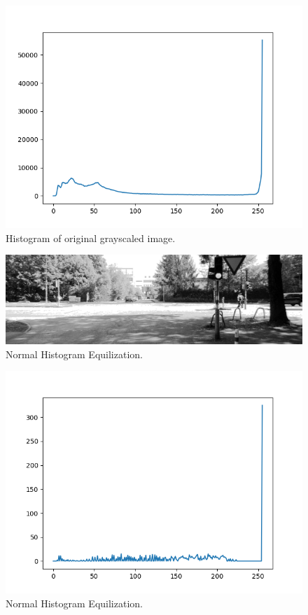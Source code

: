 \documentclass[11pt]{article}
\begin{document}
\begin{description}
\begin{figure}[H]
  \centering
	\includegraphics[height=0.7\textwidth]{Q1_a_img_hist}
	\caption{Histogram of original grayscaled image.} 
\end{figure}

\begin{figure}[H]
  \centering
	\includegraphics[width=1\textwidth]{Hist}
	\caption{Normal Histogram Equilization.} 
\end{figure}


\begin{figure}[H]
  \centering
	\includegraphics[width=1\textwidth]{Q1_a_nhe}
	\caption{Normal Histogram Equilization.} 
\end{figure}


\end{description}
\end{document}
